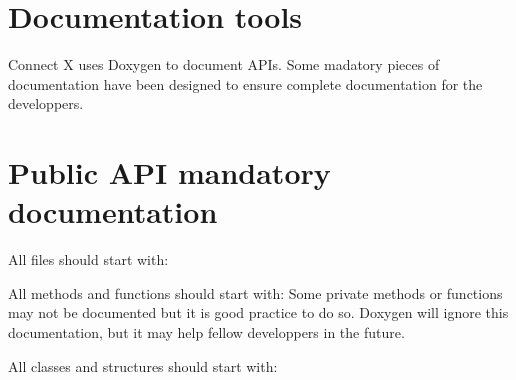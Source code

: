 %
%

%
%
%
%

\section{Documentation tools}
Connect X uses Doxygen to document APIs. Some madatory pieces of 
documentation have been designed to ensure complete documentation 
for the developpers.

\section{Public API mandatory documentation}
All files should start with:

All methods and functions should start with:
Some private methods or functions may not be documented but it is good practice 
to do so. Doxygen will ignore this documentation, but it may help fellow 
developpers in the future.

All classes and structures should start with:

